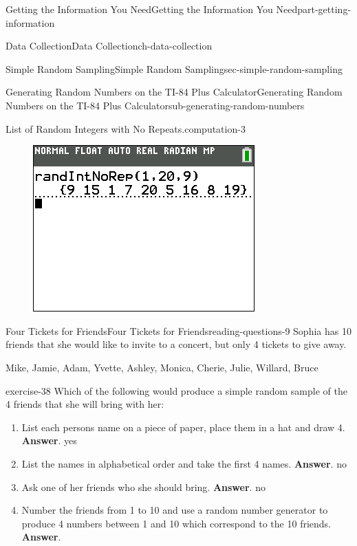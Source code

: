 \documentclass[oneside,10pt,]{book}
\newcommand{\mono}[1]{\texttt{#1}}
\numberwithin{equation}{section}
\newenvironment{codedisplay}
{\VerbatimEnvironment\begin{center}\begin{lrbox}{\codedisplaybox}\begin{BVerbatim}}
{\end{BVerbatim}\end{lrbox}\usebox{\codedisplaybox}\end{center}}
\begin{document}
\begin{partptx}{Getting the Information You Need}{}{Getting the Information You Need}{}{}{part-getting-information}
\begin{chapterptx}{Data Collection}{}{Data Collection}{}{}{ch-data-collection}
\begin{sectionptx}{Simple Random Sampling}{}{Simple Random Sampling}{}{}{sec-simple-random-sampling}
\begin{subsectionptx}{Generating Random Numbers on the TI-84 Plus Calculator}{}{Generating Random Numbers on the TI-84 Plus Calculator}{}{}{sub-generating-random-numbers}
\begin{computation}{List of Random Integers with No Repeats.}{computation-3}
%
\begin{figure}\centering\includegraphics[width=0.4\linewidth]{images/randIntNoRep.png}
\end{figure}\end{computation}
\end{subsectionptx}
%
%
\typeout{************************************************}
\typeout{************************************************}
%
\begin{reading-questions-subsection}{Four Tickets for Friends}{}{Four Tickets for Friends}{}{}{reading-questions-9}
\hypertarget{p-13}{}%
Sophia has 10 friends that she would like to invite to a concert, but only 4 tickets to give away.%
\par
\hypertarget{p-14}{}%
Mike, Jamie, Adam, Yvette, Ashley, Monica, Cherie, Julie, Willard, Bruce%
\begin{divisionexercise}{1}{}{}{exercise-38}%
Which of the following would produce a simple random sample of the 4 friends that she will bring with her: \leavevmode%
\begin{enumerate}[label=(\alph*)]
\item\hypertarget{li-13}{}List each persons name on a piece of paper, place them in a hat and draw 4. \textbf{Answer}.\quad%
yes%
\item\hypertarget{li-14}{}List the names in alphabetical order and take the first 4 names. \textbf{Answer}.\quad%
no%
\item\hypertarget{li-15}{}Ask one of her friends who she should bring. \textbf{Answer}.\quad%
no%
\item\hypertarget{li-16}{}Number the friends from 1 to 10 and use a random number generator to produce 4 numbers between 1 and 10 which correspond to the 10 friends. \textbf{Answer}.\quad%

\end{enumerate}
\end{divisionexercise}
\end{reading-questions-subsection}
\end{sectionptx}
\end{chapterptx}
\end{partptx}
\end{document}
